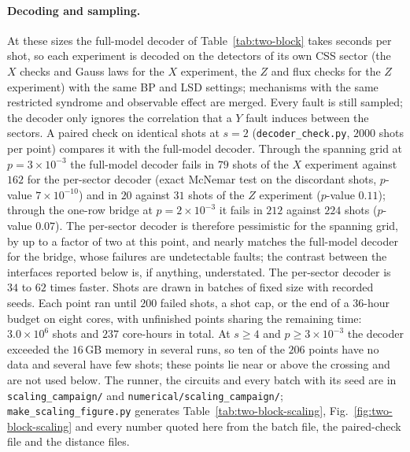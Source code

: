 \documentclass[aps,prx,reprint,superscriptaddress,nofootinbib,floatfix,longbibliography]{revtex4-2}
\theoremstyle{definition}
\begin{document}
\paragraph{Decoding and sampling.}
At these sizes the full-model decoder of Table~\ref{tab:two-block} takes
seconds per shot, so each experiment is decoded on the detectors of its own
CSS sector (the $X$ checks and Gauss laws for the $X$ experiment, the $Z$ and
flux checks for the $Z$ experiment) with the same BP and LSD settings;
mechanisms with the same restricted syndrome and observable effect are
merged.  Every fault is still sampled; the decoder only ignores the
correlation that a $Y$ fault induces between the sectors.  A paired check on
identical shots at $s=2$ (\texttt{decoder\_check.py}, $2000$ shots per point)
compares it with the full-model decoder.  Through the spanning grid at
$p=3\times10^{-3}$ the full-model decoder fails in $79$ shots of the $X$
experiment against $162$ for the per-sector decoder (exact McNemar test on the
discordant shots, $p$-value $7\times10^{-10}$) and in $20$ against $31$ shots of the $Z$
experiment ($p$-value $0.11$); through the one-row bridge at $p=2\times10^{-3}$ it fails
in $212$ against $224$ shots ($p$-value $0.07$).  The per-sector decoder is therefore
pessimistic for the spanning grid, by up to a factor of two at this point, and
nearly matches the full-model decoder for the bridge, whose failures are
undetectable faults; the contrast between the interfaces reported below is,
if anything, understated.  The per-sector decoder is $34$ to $62$ times faster.  Shots are drawn in
batches of fixed size with recorded seeds.  Each point ran until $200$ failed
shots, a shot cap, or the end of a $36$-hour budget on eight cores, with
unfinished points sharing the remaining time: $3.0\times10^6$ shots and
$237$ core-hours in total.  At $s\ge4$ and $p\ge3\times10^{-3}$ the decoder
exceeded the $16$\,GB memory in several runs, so ten of the $206$ points have
no data and several have few shots; these points lie near or above the
crossing and are not used below.  The runner, the circuits and every batch
with its seed are in \nolinkurl{scaling_campaign/} and
\nolinkurl{numerical/scaling_campaign/}; \texttt{make\_scaling\_figure.py}
generates Table~\ref{tab:two-block-scaling}, Fig.~\ref{fig:two-block-scaling}
and every number quoted here from the batch file, the paired-check file and
the distance files.
\end{document}
